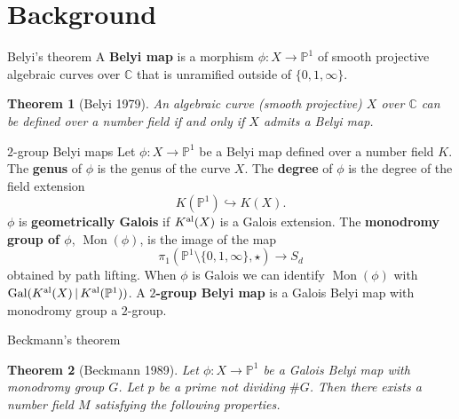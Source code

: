 \documentclass[xcolor=dvipsnames]{beamer}
\theoremstyle{plain}
\newtheorem*{thm}{Theorem}
\newcommand{\PP}{\mathbb P}
\newcommand{\CC}{\mathbb C}
\newcommand{\Kal}{{{K}^{\textup{al}}}}
\DeclareMathOperator{\Mon}{Mon}
\DeclareMathOperator{\Gal}{Gal}
\begin{document}
  \section{Background}{
    \begin{frame}{Belyi's theorem}
      A \textbf{Belyi map}
      is a morphism
      $\phi\colon X\to\PP^1$
      of smooth projective algebraic curves
      over $\CC$
      that is unramified outside of
      $\{0,1,\infty\}$.
      \pause
      \begin{thm}[Belyi 1979]
        \vspace{1pt}
        An algebraic curve (smooth projective)
        $X$ over $\CC$ can be defined over a number
        field if and only if $X$ admits a
        Belyi map.
      \end{thm}
    \end{frame}
    \begin{frame}{$2$-group Belyi maps}
      Let $\phi\colon X\to\PP^1$ be a Belyi map
      defined over a number field $K$.
      \pause\newline
      The \textbf{genus} of $\phi$ is the genus
      of the curve $X$.
      \pause\newline
      The \textbf{degree} of $\phi$
      is the degree of the field extension
      \[
        K(\PP^1)\hookrightarrow K(X).
      \]
      \pause
      $\phi$ is \textbf{geometrically Galois}
      if $\Kal(X)$ is a Galois extension.
      \pause\newline
      The \textbf{monodromy group of $\phi$},
      $\Mon(\phi)$,
      is the image of the map
      \[
        \pi_1(\PP^1\setminus\{0,1,\infty\},\star)
        \to S_d
      \]
      obtained by path lifting.
      \pause\newline
      When $\phi$ is Galois we
      can identify $\Mon(\phi)$ with
      $\Gal(\Kal(X)\,|\,\Kal(\PP^1))$.
      \pause\newline
      A \textbf{$2$-group Belyi map} is a
      Galois Belyi map with monodromy group
      a $2$-group.
    \end{frame}
    \begin{frame}{Beckmann's theorem}
      \begin{thm}[Beckmann 1989]
        \vspace{1pt}
        Let $\phi\colon X\to\PP^1$ be a Galois
        Belyi map with monodromy group $G$.
        Let $p$ be a prime not dividing
        $\#G$.
        \pause\newline
        Then there exists a number field $M$
        satisfying the following properties.

\end{thm}
\end{frame}}
\end{document}
